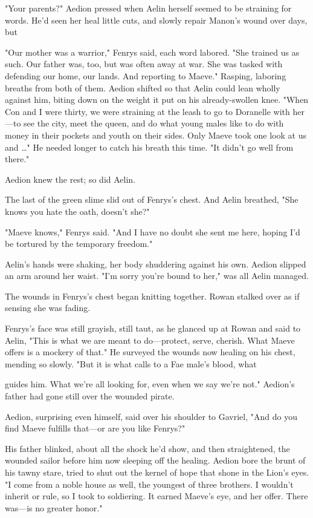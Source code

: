 "Your parents?" Aedion pressed when Aelin herself seemed to be straining for words. He'd seen her heal little cuts, and slowly repair Manon's wound over days, but 

"Our mother was a warrior," Fenrys said, each word labored. "She trained us as such. Our father was, too, but was often away at war. She was tasked with defending our home, our lands. And reporting to Maeve." Rasping, laboring breaths from both of them. Aedion shifted so that Aelin could lean wholly against him, biting down on the weight it put on his already-swollen knee. "When Con and I were thirty, we were straining at the leash to go to Doranelle with her---to see the city, meet the queen, and do  what young males like to do with money in their pockets and youth on their sides. Only Maeve took one look at us and \ldots" He needed longer to catch his breath this time. "It didn't go well from there."

Aedion knew the rest; so did Aelin.

The last of the green slime slid out of Fenrys's chest. And Aelin breathed, "She knows you hate the oath, doesn't she?"

"Maeve knows," Fenrys said. "And I have no doubt she sent me here, hoping I'd be tortured by the temporary freedom."

Aelin's hands were shaking, her body shuddering against his own. Aedion slipped an arm around her waist. "I'm sorry you're bound to her," was all Aelin managed.

The wounds in Fenrys's chest began knitting together. Rowan stalked over as if sensing she was fading.

Fenrys's face was still grayish, still taut, as he glanced up at Rowan and said to Aelin, "This is what we are meant to do---protect, serve, cherish. What Maeve offers is  a mockery of that." He surveyed the wounds now healing on his chest, mending so slowly. "But it is what calls to a Fae male's blood, what

guides him. What we're all looking for, even when we say we're not." Aedion's father had gone still over the wounded pirate.

Aedion, surprising even himself, said over his shoulder to Gavriel, "And do you find Maeve fulfills that---or are you like Fenrys?"

His father blinked, about all the shock he'd show, and then straightened, the wounded sailor before him now sleeping off the healing. Aedion bore the brunt of his tawny stare, tried to shut out the kernel of hope that shone in the Lion's eyes. "I come from a noble house as well, the youngest of three brothers. I wouldn't inherit or rule, so I took to soldiering. It earned Maeve's eye, and her offer. There was---is no greater honor."


